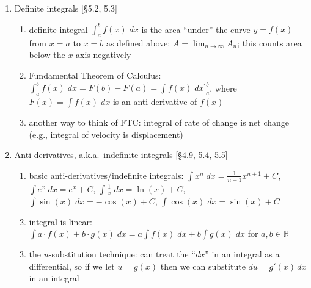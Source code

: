\documentclass[11pt]{article}
\begin{document}
\begin{enumerate}
\item Definite integrals [\S 5.2, 5.3]
\begin{enumerate}
\item definite integral $\int_{a}^{b} f(x) \; dx$ is the area ``under'' the curve $y=f(x)$ from $x=a$ to $x=b$ as defined above: $A=\lim_{n\to \infty} A_n$; this counts area below the $x$-axis negatively
\item Fundamental Theorem of Calculus: $\int_{a}^{b} f(x) \; dx = F(b)-F(a) =\int f(x) \; dx \big ]_{a}^{b}$, where $F(x) = \int f(x) \; dx$ is an anti-derivative of $f(x)$ 
\item another way to think of FTC: integral of rate of change is net change (e.g., integral of velocity is displacement)
\end{enumerate}

\item Anti-derivatives, a.k.a.~indefinite integrals [\S 4.9, 5.4, 5.5]
\begin{enumerate}
\item basic anti-derivatives/indefinite integrals: $\int x^n \; dx = \frac{1}{n+1}x^{n+1}+C$, $\int e^x \; dx = e^x + C$, $\int \frac{1}{x} \; dx = \ln(x) + C$, $\int \sin(x) \; dx = -\cos(x) +C$, $\int \cos(x) \; dx = \sin(x) + C$
\item integral is linear: $\int a\cdot f(x) + b\cdot g(x) \; dx = a\int f(x) \; dx + b \int g(x) \; dx$ for $a,b\in \mathbb{R}$
\item the $u$-substitution technique: can treat the ``$dx$'' in an integral as a differential, so if we let $u=g(x)$ then we can substitute $du = g'(x) \, dx$ in an integral
\end{enumerate}

\end{enumerate}
\end{document}
